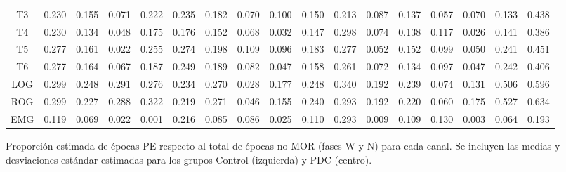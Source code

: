 \documentclass[12pt,a4paper]{mitthesis}
\begin{document}
\begin{SidewaysFigure}
\begin{tabular}{c||ccccc|cc||cccc|cc||ccc}
T3&0.230&0.155&0.071&0.222&0.235&0.182&0.070&0.100&0.150&0.213&0.087&0.137&0.057&0.070&0.133&0.438 \\
T4&0.230&0.134&0.048&0.175&0.176&0.152&0.068&0.032&0.147&0.298&0.074&0.138&0.117&0.026&0.141&0.386 \\
T5&0.277&0.161&0.022&0.255&0.274&0.198&0.109&0.096&0.183&0.277&0.052&0.152&0.099&0.050&0.241&0.451 \\
T6&0.277&0.164&0.067&0.187&0.249&0.189&0.082&0.047&0.158&0.261&0.072&0.134&0.097&0.047&0.242&0.406 \\
LOG&0.299&0.248&0.291&0.276&0.234&0.270&0.028&0.177&0.248&0.340&0.192&0.239&0.074&0.131&0.506&0.596 \\
ROG&0.299&0.227&0.288&0.322&0.219&0.271&0.046&0.155&0.240&0.293&0.192&0.220&0.060&0.175&0.527&0.634 \\
EMG&0.119&0.069&0.022&0.001&0.216&0.085&0.086&0.025&0.110&0.293&0.009&0.109&0.130&0.003&0.064&0.193
\end{tabular}
\caption{Proporci\'on estimada de \'epocas PE respecto al total de \'epocas no-MOR (fases W y N) 
para cada canal. Se incluyen las medias y desviaciones est\'andar estimadas para los grupos Control 
(izquierda) y PDC (centro).}
\label{gpos_nmor}
\end{SidewaysFigure}

\end{document}
